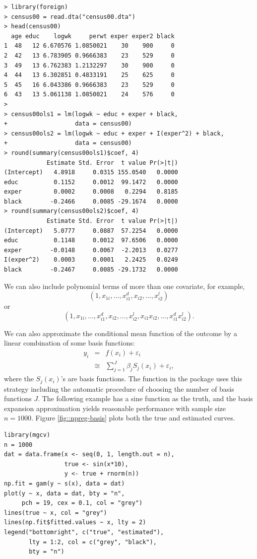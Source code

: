 \begin{lstlisting}
> library(foreign)
> census00 = read.dta("census00.dta")
> head(census00)
  age educ    logwk     perwt exper exper2 black
1  48   12 6.670576 1.0850021    30    900     0
2  42   13 6.783905 0.9666383    23    529     0
3  49   13 6.762383 1.2132297    30    900     0
4  44   13 6.302851 0.4833191    25    625     0
5  45   16 6.043386 0.9666383    23    529     0
6  43   13 5.061138 1.0850021    24    576     0
> 
> census00ols1 = lm(logwk ~ educ + exper + black, 
+                   data = census00)
> census00ols2 = lm(logwk ~ educ + exper + I(exper^2) + black, 
+                   data = census00)
> round(summary(census00ols1)$coef, 4)
            Estimate Std. Error  t value Pr(>|t|)
(Intercept)   4.8918     0.0315 155.0540   0.0000
educ          0.1152     0.0012  99.1472   0.0000
exper         0.0002     0.0008   0.2294   0.8185
black        -0.2466     0.0085 -29.1674   0.0000
> round(summary(census00ols2)$coef, 4)
            Estimate Std. Error  t value Pr(>|t|)
(Intercept)   5.0777     0.0887  57.2254   0.0000
educ          0.1148     0.0012  97.6506   0.0000
exper        -0.0148     0.0067  -2.2013   0.0277
I(exper^2)    0.0003     0.0001   2.2425   0.0249
black        -0.2467     0.0085 -29.1732   0.0000
\end{lstlisting}


We can also include polynomial terms of more than one covariate, for example,
$$
(1,x_{1i},\ldots,x_{i1}^{d},x_{i2},\ldots,x_{i2}^{l})
$$
or 
$$
(1,x_{1i},\ldots,x_{i1}^{d},x_{i2},\ldots,x_{i2}^{l},x_{i1}x_{i2},\ldots,x_{i1}^{d}x_{i2}^{l}).
$$
 


We can also approximate the conditional mean function of the outcome by a linear combination of some basis functions:
\begin{eqnarray*}
y_{i} &=& f(x_{i})+\varepsilon_{i} \\
& \cong & \sum_{j=1}^{J}\beta_{j}S_{j}(x_{i})+\varepsilon_{i},
\end{eqnarray*}
where the $S_{j}(x_{i})$'s are basis functions. The  function in the  package uses this strategy including the automatic procedure of choosing the number of basis functions $J$. The following example has a sine function as the truth, and the basis expansion approximation yields reasonable performance with sample size $n=1000$. Figure \ref{fig::npreg-basis} plots both the true and estimated curves.

\begin{lstlisting}
library(mgcv)
n = 1000
dat = data.frame(x <- seq(0, 1, length.out = n),
                 true <- sin(x*10),
                 y <- true + rnorm(n))
np.fit = gam(y ~ s(x), data = dat)
plot(y ~ x, data = dat, bty = "n",
     pch = 19, cex = 0.1, col = "grey")
lines(true ~ x, col = "grey") 
lines(np.fit$fitted.values ~ x, lty = 2)
legend("bottomright", c("true", "estimated"), 
       lty = 1:2, col = c("grey", "black"), 
       bty = "n")
\end{lstlisting} 




